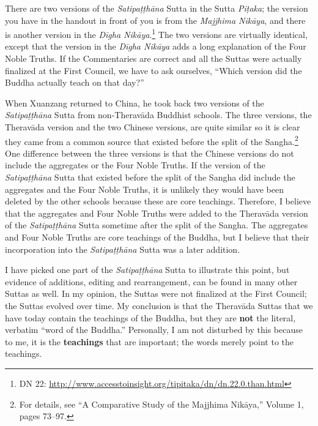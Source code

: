 There are two versions of the \textit{Satipaṭṭhāna} Sutta in the Sutta \textit{Piṭaka}; the version you have in the handout in front of you is from the \textit{Majjhima Nikāya}, and there is another version in the \textit{Dīgha Nikāya}.\footnote{DN 22: \url{http://www.accesstoinsight.org/tipitaka/dn/dn.22.0.than.html}} The two versions are virtually identical, except that the version in the \textit{Dīgha Nikāya} adds a long explanation of the Four Noble Truths. If the Commentaries are correct and all the Suttas were actually finalized at the First Council, we have to ask ourselves, “Which version did the Buddha actually teach on that day?”

When Xuanzang returned to China, he took back two versions of the \textit{Satipaṭṭhāna} Sutta from non-Theravāda Buddhist schools. The three versions, the Theravāda version and the two Chinese versions, are quite similar so it is clear they came from a common source that existed before the split of the Sangha.\footnote{For details, see “A Comparative Study of the Majjhima Nikāya,” Volume 1, pages 73--97.} One difference between the three versions is that the Chinese versions do not include the aggregates or the Four Noble Truths. If the version of the \textit{Satipaṭṭhāna} Sutta that existed before the split of the Sangha did include the aggregates and the Four Noble Truths, it is unlikely they would have been deleted by the other schools because these are core teachings. Therefore, I believe that the aggregates and Four Noble Truths were added to the Theravāda version of the \textit{Satipaṭṭhāna} Sutta sometime after the split of the Sangha. The aggregates and Four Noble Truths are core teachings of the Buddha, but I believe that their incorporation into the \textit{Satipaṭṭhāna} Sutta was a later addition.

I have picked one part of the \textit{Satipaṭṭhāna} Sutta to illustrate this point, but evidence of additions, editing and rearrangement, can be found in many other Suttas as well. In my opinion, the Suttas were not finalized at the First Council; the Suttas evolved over time. My conclusion is that the Theravāda Suttas that we have today contain the teachings of the Buddha, but they are \textbf{not} the literal, verbatim “word of the Buddha.” Personally, I am not disturbed by this because to me, it is the \textbf{teachings} that are important; the words merely point to the teachings.

\pagebreak

